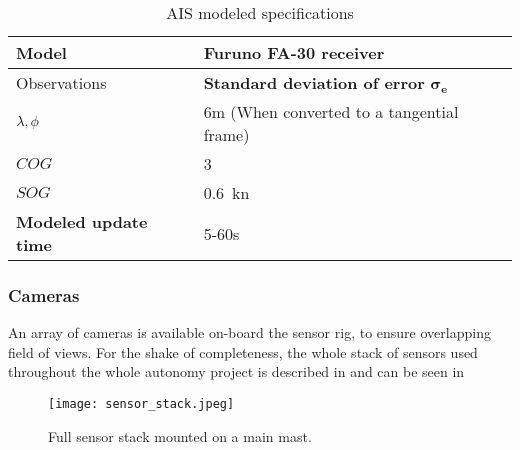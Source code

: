 \begin{table}[H]
	\centering
	\caption{AIS modeled specifications}
	\label{tab:AIS_specs}
	\begin{tabular}{ll}
		\hline
		\textbf{Model} &  Furuno FA-30 receiver\\ \hline
		Observations&\textbf{Standard deviation of error} $\mathbf{\sigma_e}$   \\
		${{\lambda} ,{\phi}}$ & 6m (When converted to a tangential frame) \\
		${COG}$ & \SI{3}{\deg} \\
		${SOG}$ & \SI{0.6}{\knot} \\ \hline
		\textbf{Modeled update time} & 5-60s \\ \hline
	\end{tabular}
\end{table}

\subsubsection{Cameras}

An array of cameras is available on-board the sensor rig, to ensure overlapping field of views. For the shake of completeness, the whole stack of sensors used throughout the whole autonomy project is described in  and can be seen in 


\begin{figure}[H]
	\centering
	\texttt{[image: sensor\_stack.jpeg]}
	\caption{Full sensor stack mounted on a main mast.}
	\label{fig:stack}
\end{figure}

\begin{table}[H]
	\centering
	\caption{Sensor stack on the mast illustrated in .}
	\label{tab:stack}
\end{table}

